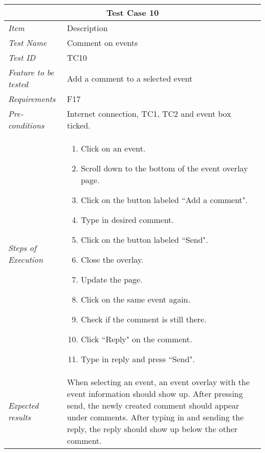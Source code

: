 %
\begin{minipage}{\linewidth}
\setlength{\tabcolsep}{15pt}
\centering
{}
\begin{tabular}{ |l|p{70mm}| }
	\hline
	\multicolumn{2}{|c|}{\cellcolor{gray!25} \textbf{Test Case 10}} \\
	\hline
	\it{\cellcolor{gray!25}Item} & {\cellcolor{gray!25} Description } \\
	\hline
	\it{\cellcolor{gray!25}Test Name } & Comment on events \\ \hline
	\it{\cellcolor{gray!25}Test ID} & TC10 \\ \hline
	\it{\cellcolor{gray!25}Feature to be tested} & Add a comment to a selected event \\ \hline
	\it{\cellcolor{gray!25}Requirements} & F17  \\ \hline
	\it{\cellcolor{gray!25}Pre-conditions} & Internet connection, TC1, TC2 and event box ticked.  \\ \hline
	\it{\cellcolor{gray!25}Steps of Execution} & \begin{enumerate}
	                                       \item Click on an event.
	                                       \item Scroll down to the bottom of the event overlay page.
	                                       \item Click on the button labeled ``Add a comment".
	                                       \item Type in desired comment.
	                                       \item Click on the button labeled ``Send".
	                                       \item Close the overlay.
	                                       \item Update the page.
	                                       \item Click on the same event again.
	                                       \item Check if the comment is still there.
	                                       \item Click ``Reply" on the comment.
	                                       \item Type in reply and press ``Send".
	                                     \end{enumerate} \\ \hline
	\it{\cellcolor{gray!25}Expected results} & When selecting an event, an event overlay with the event information should show up. After pressing send, the newly created comment should appear under comments. After typing in and sending the reply, the reply should show up below the other comment. \\
	\hline
\end{tabular}
\medskip
\end{minipage}
